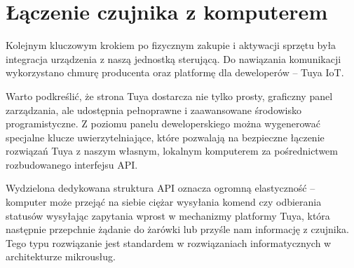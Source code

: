 \documentclass[12pt,a4paper]{article}
\begin{document}
\section{Łączenie czujnika z komputerem}

Kolejnym kluczowym krokiem po fizycznym zakupie i aktywacji sprzętu była integracja urządzenia z naszą jednostką sterującą. Do nawiązania komunikacji wykorzystano chmurę producenta oraz platformę dla deweloperów -- Tuya IoT.

Warto podkreślić, że strona Tuya dostarcza nie tylko prosty, graficzny panel zarządzania, ale udostępnia pełnoprawne i zaawansowane środowisko programistyczne. Z poziomu panelu deweloperskiego można wygenerować specjalne klucze uwierzytelniające, które pozwalają na bezpieczne łączenie rozwiązań Tuya z naszym własnym, lokalnym komputerem za pośrednictwem rozbudowanego interfejsu API. 

Wydzielona dedykowana struktura API oznacza ogromną elastyczność -- komputer może przejąć na siebie ciężar wysyłania komend czy odbierania statusów wysyłając zapytania wprost w mechanizmy platformy Tuya, która następnie przepchnie żądanie do żarówki lub przyśle nam informację z czujnika. Tego typu rozwiązanie jest standardem w rozwiązaniach informatycznych w architekturze mikrousług.
\end{document}
